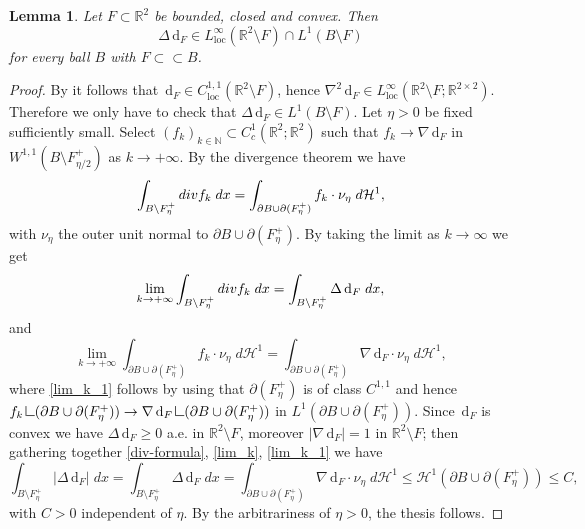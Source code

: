 \documentclass[11pt]{article}
\numberwithin{equation}{section}
\newcommand{\R}{\mathbb{R}}
\newcommand{\di}{\,\mathrm{d}}
\newcommand{\Div}{\textup{div}}
\newcommand{\resa}{\mathop{\hbox{\vrule height 7pt width 0.5pt depth 0pt
\vrule height 0.5pt width 6pt depth 0pt}}\nolimits}
\newcommand{\resb}{\mathop{\hbox{\vrule height 4pt width 0.5pt depth 0pt
\vrule height 0.5pt width 3pt depth 0pt}}\nolimits}
\newcommand{\res}{\mathchoice{\resa}{\resa}{\resb}{\resb}}
\newtheorem{lemma}[theorem]{Lemma}
\theoremstyle{definition}
\begin{document}
\begin{lemma}\label{lem:prop_distanza_da_convesso}
Let $F\subset\R^2$ be bounded, closed and convex.
Then
\[
\Delta\di_F\in L^{\infty}_\mathrm{loc}(\R^2\setminus F)\cap L^1(B\setminus F)
\]
for every ball $B$ with $F\subset\subset B$.
\end{lemma}
\begin{proof}
By \cite[Th.\,3.6.7, p.\,75]{Can-Sin} it follows that $\di_F\in C^{1,1}_\mathrm{loc}(\R^2\setminus F)$, hence $\nabla^2\di_F\in L^{\infty}_\mathrm{loc}(\R^2\setminus F;\R^{2\times 2})$.
Therefore we only have to check that $\Delta\di_F\in L^1(B\setminus F)$.
Let $\eta>0$ be fixed sufficiently small.
Select $(f_k)_{k\in\mathbb{N}}\subset C^1_c(\R^2; \R^2)$ such that
$f_k\to \nabla\di_F$ in $W^{1,1}(B
\setminus F_{\eta/2}^+)$ as $k\to+\infty$.
By the divergence theorem we have
\begin{equation}\label{div-formula}
\int_{B\setminus F^+_\eta}\Div f_k\;dx=\int_{
\partial B\cup\partial (F^+_\eta)}f_k\cdot\nu_\eta \;d\mathcal{H}^1,
\end{equation}
with $\nu_\eta$ the outer unit normal to $\partial B\cup\partial (F^+_\eta)$.
By taking the limit as $k\to \infty$ we get
\begin{equation}\label{lim_k}
\lim_{k\to+\infty} \int_{B\setminus F^+_\eta}\Div f_k\;dx=\int_{B\setminus F^+_\eta}\Delta\di_F \;dx,
\end{equation}
and
\begin{equation}\label{lim_k_1}
\lim_{k\to+\infty} \int_{\partial B\cup\partial (F^+_\eta)}f_k\cdot\nu_\eta\; d\mathcal{H}^1= \int_{\partial B\cup\partial (F^+_\eta)}\nabla\di_F\cdot\nu_\eta\; d\mathcal{H}^1,
\end{equation}
where \eqref{lim_k_1} follows by using that $\partial(F^+_\eta)$ is of class $C^{1,1}$ and hence $f_k\res(\partial B\cup\partial (F^+_\eta))\to\nabla\di_F\res(\partial B\cup\partial (F^+_\eta))$
in $L^1(\partial B\cup\partial (F^+_\eta))$.
Since $\di_F$ is convex we have $\Delta\di_F\ge0$ a.e. in $\R^2\setminus F$, moreover
$|\nabla\di_F|=1$ in $\R^2\setminus F$; then gathering together \eqref{div-formula}, \eqref{lim_k}, \eqref{lim_k_1} we have
\begin{equation*}
\int_{B\setminus F^+_\eta}|\Delta\di_F|\; dx=
\int_{B\setminus F^+_\eta}\Delta\di_F \;dx=
\int_{\partial B\cup\partial (F^+_\eta)}\!\!\!\!\!\!\!\!\nabla\di_F\cdot\nu_\eta \;d\mathcal{H}^1\le \mathcal{H}^1(\partial B\cup\partial(F^+_\eta))\le C,
\end{equation*}
with $C>0$ independent of $\eta$.
By the arbitrariness of $\eta>0$, the thesis follows.
\end{proof}
\end{document}
